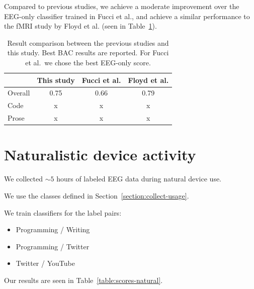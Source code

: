         Compared to previous studies, we achieve a moderate improvement over the EEG-only classifier trained in Fucci et al., and achieve a similar performance to the fMRI study by Floyd et al. (seen in Table~\ref{table:compare-results}).

        \begin{table}
            \begin{center}
                \begin{tabular}{lccc}
                    \toprule
                    & \textbf{This study} & \textbf{Fucci et al.} & \textbf{Floyd et al.} \\
                    \midrule
                    Overall & 0.75 & 0.66 & 0.79 \\
                    Code & x & x & x \\
                    Prose & x & x & x \\
                    \bottomrule
                \end{tabular}
                \caption{Result comparison between the previous studies and this study. Best BAC results are reported. For Fucci et al.\ we chose the best EEG-only score.}\label{table:compare-results}
            \end{center}
        \end{table}

    \section{Naturalistic device activity}

        We collected $\sim5$ hours of labeled EEG data during natural device use.

        We use the classes defined in Section~\ref{section:collect-usage}.

        We train classifiers for the label pairs:

        \begin{itemize}
                \item Programming / Writing
                \item Programming / Twitter
                \item Twitter / YouTube
        \end{itemize}

        Our results are seen in Table~\ref{table:scores-natural}.

